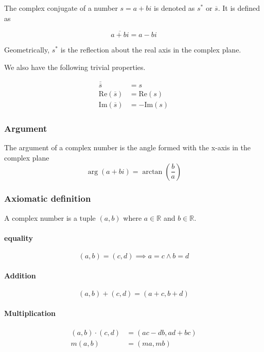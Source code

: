 \documentclass[a4paper]{article}
\begin{document}
The complex conjugate of a number \(s=a+bi\) is denoted as \(s^*\) or \(\overline{s}\).
It is defined as

\[
    \overline{a+bi} = a-bi
\]

Geometrically, \(s^*\) is the reflection about the real axis in the complex plane.

We also have the following trivial properties.

\begin{align*}
    \overline{\overline{s}} &= s
    \\
    \text{Re}(\overline{s}) &= \text{Re}(s)
    \\
    \text{Im}(\overline{s}) &= -\text{Im}(s)
\end{align*}

\subsubsection{Argument}

The argument of a complex number is the angle formed with the x-axis in
the complex plane
\[
    \arg(a+bi)=\arctan \left(\frac{b}{a}\right)
\]

\subsubsection{Axiomatic definition}

A complex number is a tuple \((a,b)\) where \(a\in \mathbb{R}\) and \(b\in \mathbb{R}\).

\paragraph{equality}
\[
    (a,b) = (c,d) \implies a=c \land b=d
\]

\paragraph{Addition}
\[
    (a,b) + (c,d) = (a+c, b+d)
\]

\paragraph{Multiplication}
\begin{align*}
    (a,b) \cdot (c,d) &= (ac-db, ad+bc)
    \\
    m(a,b) &= (ma, mb)
\end{align*}
\end{document}
